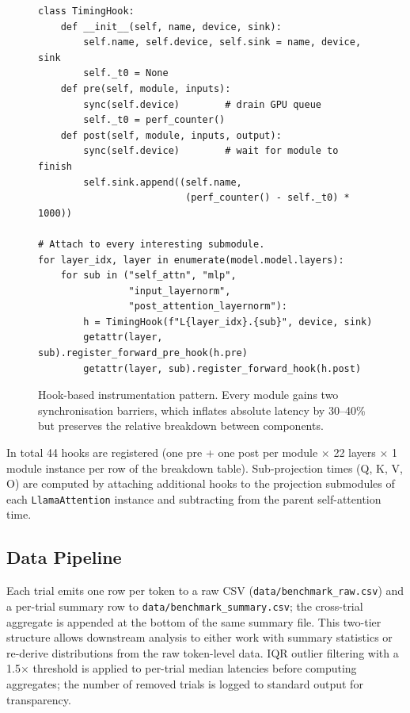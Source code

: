 \documentclass[conference]{IEEEtran}
\begin{document}
\begin{figure}[!t]
\begin{small}
\begin{verbatim}
class TimingHook:
    def __init__(self, name, device, sink):
        self.name, self.device, self.sink = name, device, sink
        self._t0 = None
    def pre(self, module, inputs):
        sync(self.device)        # drain GPU queue
        self._t0 = perf_counter()
    def post(self, module, inputs, output):
        sync(self.device)        # wait for module to finish
        self.sink.append((self.name,
                          (perf_counter() - self._t0) * 1000))

# Attach to every interesting submodule.
for layer_idx, layer in enumerate(model.model.layers):
    for sub in ("self_attn", "mlp",
                "input_layernorm",
                "post_attention_layernorm"):
        h = TimingHook(f"L{layer_idx}.{sub}", device, sink)
        getattr(layer, sub).register_forward_pre_hook(h.pre)
        getattr(layer, sub).register_forward_hook(h.post)
\end{verbatim}
\end{small}
\caption{Hook-based instrumentation pattern. Every module gains two
synchronisation barriers, which inflates absolute latency by 30--40\%
but preserves the relative breakdown between components.}
\label{lst:hook}
\end{figure}

In total 44 hooks are registered (one pre + one post per module $\times$
22 layers $\times$ 1 module instance per row of the breakdown table).
Sub-projection times (Q, K, V, O) are computed by attaching additional
hooks to the projection submodules of each \texttt{LlamaAttention}
instance and subtracting from the parent self-attention time.

\subsection{Data Pipeline}

Each trial emits one row per token to a raw CSV
(\texttt{data/benchmark\_raw.csv}) and a per-trial summary row to
\texttt{data/benchmark\_summary.csv}; the cross-trial aggregate is
appended at the bottom of the same summary file. This two-tier structure
allows downstream analysis to either work with summary statistics or
re-derive distributions from the raw token-level data. IQR outlier
filtering with a 1.5$\times$ threshold is applied to per-trial median
latencies before computing aggregates; the number of removed trials is
logged to standard output for transparency.
\end{document}

